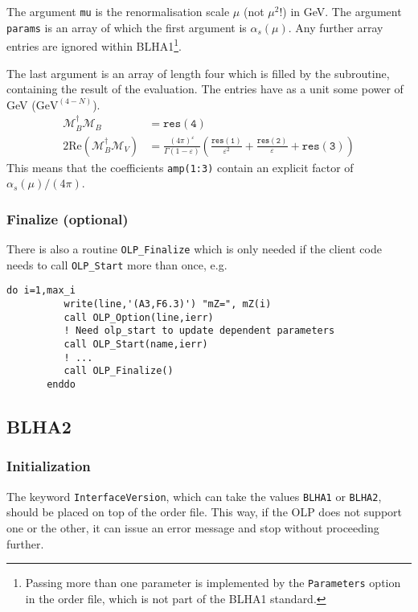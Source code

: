The argument \texttt{mu} is the renormalisation scale $\mu$ (not $\mu^2$!)
in GeV. The argument {\tt params} is an array of which the first argument is
$\alpha_s(\mu)$. Any further array entries are ignored within BLHA1\footnote{
Passing more than one parameter is implemented by the \texttt{Parameters}
option in the order file, which is  not part of the BLHA1 standard.}.

The last argument is an array of length four which is filled by the subroutine, 
containing the result of the evaluation. The entries have as a unit some
power of GeV ($\mathrm{GeV}^{(4-N)}$).
\begin{align}
\label{eq:res}
\mathcal{M}_B^\dagger\mathcal{M}_B&=\mathtt{res(4)}\nonumber\\
2\mathrm{Re}\left(\mathcal{M}_B^\dagger\mathcal{M}_V\right)&=
\frac{(4\pi)^\varepsilon}{\Gamma(1-\varepsilon)}\left(
\frac{\mathtt{res(1)}}{\varepsilon^2}
+\frac{\mathtt{res(2)}}{\varepsilon}
+\mathtt{res(3)}
\right)
\end{align}
This means that the coefficients \texttt{amp(1:3)} contain
an explicit factor of $\alpha_s(\mu)/(4\pi)$.

\subsubsection{Finalize (optional)}
There is also a routine \texttt{OLP\_Finalize} which is only needed
if the client code needs to call \texttt{OLP\_Start} more than once, e.g.
\begin{lstlisting}[columns=fullflexibel]
       do i=1,max_i
          write(line,'(A3,F6.3)') "mZ=", mZ(i)
          call OLP_Option(line,ierr)
          ! Need olp_start to update dependent parameters
          call OLP_Start(name,ierr)
          ! ...
          call OLP_Finalize()
       enddo
\end{lstlisting}

\subsection{BLHA2}



\subsubsection{Initialization}
The keyword {\tt InterfaceVersion}, which can take the values
{\tt BLHA1} or {\tt BLHA2}, should be placed on top of the order file. 
This way, if the OLP does not support one or the other, it can issue an error message and stop 
without proceeding further.

